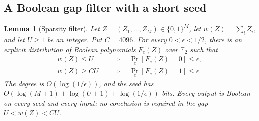 \documentclass[11pt,letterpaper]{article}
\newtheorem{lemma}[theorem]{Lemma}
\theoremstyle{definition}
\theoremstyle{remark}
\begin{document}
\subsection{A Boolean gap filter with a short seed}
\label{filt:gap-subsection}

\begin{lemma}[Sparsity filter]\label{filt:gap}
Let $Z=(Z_1,\ldots,Z_M)\in\{0,1\}^M$, let
$w(Z)=\sum_i Z_i$, and let $U\ge1$ be an integer.  Put $C=4096$.
For every $0<\epsilon<1/2$, there is an explicit distribution of Boolean
polynomials $F_e(Z)$ over $\mathbb F_2$ such that
\[
 \begin{split}
 w(Z)\le U&\quad\Longrightarrow\quad
       \Pr_e[F_e(Z)=0]\le\epsilon,\\
 w(Z)\ge CU&\quad\Longrightarrow\quad
       \Pr_e[F_e(Z)=1]\le\epsilon.
 \end{split}
\]
The degree is $O(\log(1/\epsilon))$, and the seed has
$O(\log(M+1)+\log(U+1)+\log(1/\epsilon))$ bits.  Every output is Boolean
on every seed and every input; no conclusion is required in the gap
$U<w(Z)<CU$.
\end{lemma}
\end{document}
